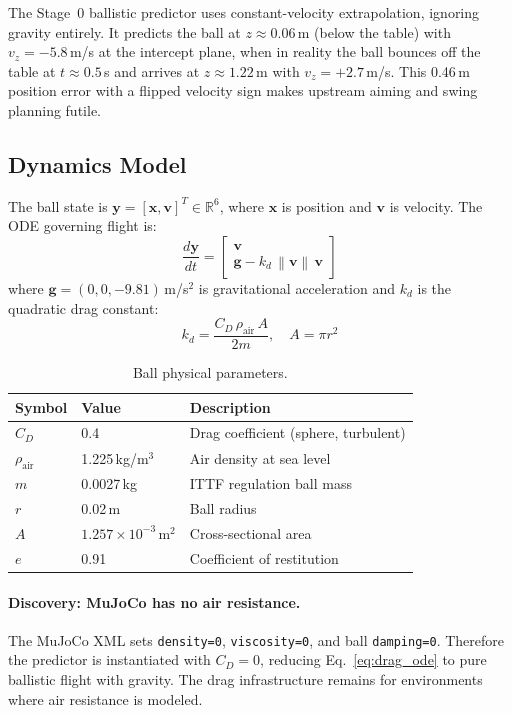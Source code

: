 \documentclass[11pt,letterpaper]{article}
\newcommand{\vv}[1]{\mathbf{#1}}
\newcommand{\norm}[1]{\left\|#1\right\|}
\begin{document}
The Stage~0 ballistic predictor uses constant-velocity extrapolation, ignoring gravity entirely.  It predicts the ball at $z \approx 0.06$\,m (below the table) with $v_z = -5.8$\,m/s at the intercept plane, when in reality the ball bounces off the table at $t \approx 0.5$\,s and arrives at $z \approx 1.22$\,m with $v_z = +2.7$\,m/s.  This 0.46\,m position error with a flipped velocity sign makes upstream aiming and swing planning futile.

\subsection{Dynamics Model}

The ball state is $\vv{y} = [\vv{x}, \vv{v}]^T \in \mathbb{R}^6$, where $\vv{x}$ is position and $\vv{v}$ is velocity.  The ODE governing flight is:
\begin{equation}
    \frac{d\vv{y}}{dt} = \begin{bmatrix} \vv{v} \\ \vv{g} - k_d\,\norm{\vv{v}}\,\vv{v} \end{bmatrix}
    \label{eq:drag_ode}
\end{equation}
where $\vv{g} = (0, 0, -9.81)$\,m/s$^2$ is gravitational acceleration and $k_d$ is the quadratic drag constant:
\begin{equation}
    k_d = \frac{C_D\,\rho_{\text{air}}\,A}{2m},
    \quad A = \pi r^2
\end{equation}

\begin{table}[H]
\centering\small
\caption{Ball physical parameters.}
\begin{tabular}{@{}lll@{}}
\toprule
Symbol & Value & Description \\
\midrule
$C_D$ & 0.4 & Drag coefficient (sphere, turbulent) \\
$\rho_{\text{air}}$ & 1.225\,kg/m$^3$ & Air density at sea level \\
$m$ & 0.0027\,kg & ITTF regulation ball mass \\
$r$ & 0.02\,m & Ball radius \\
$A$ & $1.257 \times 10^{-3}$\,m$^2$ & Cross-sectional area \\
$e$ & 0.91 & Coefficient of restitution \\
\bottomrule
\end{tabular}
\end{table}

\paragraph{Discovery: MuJoCo has no air resistance.}  The MuJoCo XML sets \texttt{density=0}, \texttt{viscosity=0}, and ball \texttt{damping=0}.  Therefore the predictor is instantiated with $C_D = 0$, reducing Eq.~\eqref{eq:drag_ode} to pure ballistic flight with gravity.  The drag infrastructure remains for environments where air resistance is modeled.
\end{document}
